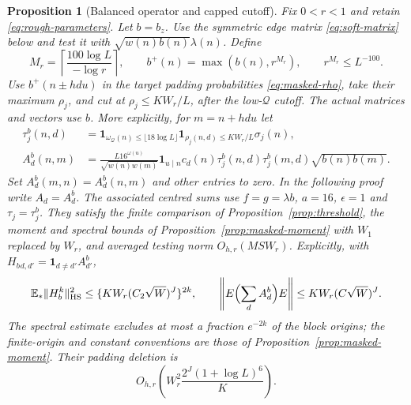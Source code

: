 \documentclass[11pt]{article}
\newtheorem{proposition}[theorem]{Proposition}
\theoremstyle{definition}
\newcommand{\E}{\mathbb E}
\newcommand{\ind}{\mathbf 1}
\DeclareMathOperator{\HS}{HS}
\theoremstyle{remark}
\numberwithin{equation}{section}
\newcommand{\Qset}{\mathcal Q}
\begin{document}
\begin{proposition}[Balanced operator and capped cutoff]\label{prop:soft-graph}
Fix $0<r<1$ and retain \eqref{eq:rough-parameters}. Let $b=b_z$.
Use the symmetric edge matrix \eqref{eq:soft-matrix} below and test it with $\sqrt{w(n)b(n)}\lambda(n)$.
Define
\begin{equation}\label{eq:soft-cap}
 M_r=\left\lceil\frac{100\log L}{-\log r}\right\rceil,\qquad
 b^+(n)=\max(b(n),r^{M_r}),\qquad r^{M_r}\le L^{-100}.
\end{equation}
Use $b^+(n\pm hdu)$ in the target padding probabilities \eqref{eq:masked-rho}, take their maximum $\rho_j$, and
cut at $\rho_j\le KW_r/L$, after the low-$\Qset$ cutoff. The actual matrices and vectors use $b$. More explicitly, for $m=n+hdu$ let
\begin{equation}\label{eq:soft-matrix}
\begin{aligned}
 \tau_j^b(n,d)&=\ind_{\omega_{\Qset}(n)\le\lfloor18\log L\rfloor}
 \ind_{\rho_j(n,d)\le KW_r/L}\sigma_j(n),\\
 A_d^b(n,m)&=\frac{L16^{\omega(u)}}{\sqrt{w(n)w(m)}}\ind_{u\mid n}c_d(n)
 \tau_j^b(n,d)\tau_j^b(m,d)\sqrt{b(n)b(m)}.
\end{aligned}
\end{equation}
Set $A_d^b(m,n)=A_d^b(n,m)$ and other entries to zero. In the following proof write $A_d=A_d^b$.
The associated centred sums use $f=g=\lambda b$, $a=16$, $\epsilon=1$ and $\tau_j=\tau_j^b$.
They satisfy the finite comparison of Proposition~\ref{prop:threshold}, the moment and spectral bounds of
Proposition~\ref{prop:masked-moment} with $W_1$ replaced by $W_r$, and averaged testing norm $O_{h,r}(MSW_r)$.
Explicitly, with $H_b{}_{d,d'}=\ind_{d\ne d'}A_{d'}^b$,
\begin{equation}\label{eq:soft-moment-spectrum}
 \E_*\|H_b^k\|_{\HS}^2\le\{KW_r(C_2\sqrt W)^J\}^{2k},\qquad
 \left\|E\Bigl(\sum_d A_d^b\Bigr)E\right\|\le KW_r(C\sqrt W)^J.
\end{equation}
The spectral estimate excludes at most a fraction $e^{-2k}$ of the block origins; the finite-origin and
constant conventions are those of Proposition~\ref{prop:masked-moment}.
Their padding deletion is
\begin{equation}\label{eq:soft-deletion}
 O_{h,r}\left(W_r^2\frac{2^J(1+\log L)^6}{K}\right).
\end{equation}
\end{proposition}
\end{document}
